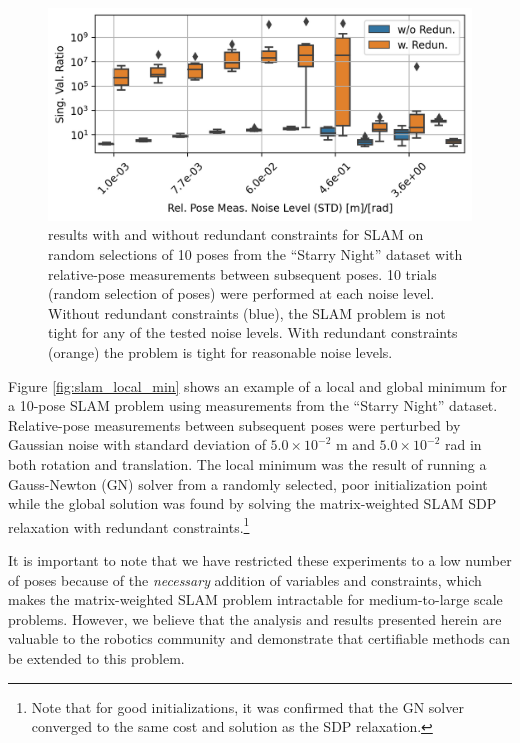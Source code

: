 \documentclass[lettersize,journal]{IEEEtran}
\newcommand{\rev}[1]{\color{red}{#1}\color{black}}
\begin{document}
\begin{figure}[!b]
	\centering
	\includegraphics[width=\columnwidth]{figs/d3_slam_redun_box}
	\caption{\rev{ER } results with and without redundant constraints for SLAM on random selections of 10 poses from the ``Starry Night'' dataset with relative-pose measurements between subsequent poses. 10 trials (random selection of poses) were performed at each noise level. Without redundant constraints (blue), the SLAM problem is not tight for any of the tested noise levels. With redundant constraints (orange) the problem is tight for reasonable noise levels.}
	\label{fig:d3_slam_box}
\end{figure}

Figure \ref{fig:slam_local_min} shows an example of a local and global minimum for a 10-pose SLAM problem using measurements from the ``Starry Night'' dataset. Relative-pose measurements between subsequent poses were perturbed by Gaussian noise with standard deviation of $5.0 \times 10^{-2}$ m and $5.0 \times 10^{-2}$ rad in both rotation and translation. The local minimum was the result of running a Gauss-Newton (GN) solver from a randomly selected, poor initialization point while the global solution was found by solving the matrix-weighted SLAM SDP relaxation with redundant constraints.\footnote{Note that for good initializations, it was confirmed that the GN solver converged to the same cost and solution as the SDP relaxation.}

It is important to note that we have restricted these experiments to a low number of poses because of the \emph{necessary} addition of variables and constraints, which makes the matrix-weighted SLAM problem intractable for medium-to-large scale problems. However, we believe that the analysis and results presented herein are valuable to the robotics community and demonstrate that certifiable methods can be extended to this problem.
\end{document}
